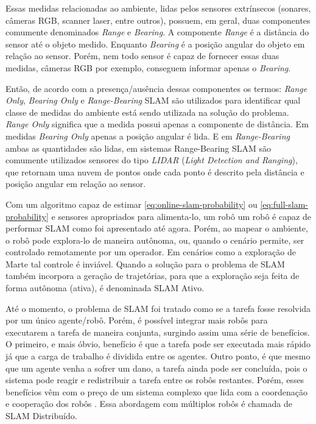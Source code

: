 Essas medidas relacionadas ao ambiente, lidas pelos sensores extrínsecos 
(sonares, câmeras RGB, scanner laser, entre outros), possuem, em geral, duas 
componentes comumente denominados \textit{Range} e \textit{Bearing}. 
A componente \textit{Range} é a distância do sensor até o objeto medido. 
Enquanto \textit{Bearing} é a posição angular do objeto em relação ao sensor. 
Porém, nem todo sensor é capaz de fornecer essas duas medidas, câmeras RGB por 
exemplo, conseguem  informar apenas o \textit{Bearing}.

Então, de acordo com a presença/ausência dessas componentes os termos: 
\textit{Range Only}, \textit{Bearing Only} e \textit{Range-Bearing} SLAM são 
utilizados para identificar qual classe de medidas do ambiente está sendo
utilizada na solução do problema. \textit{Range Only} significa que a medida 
possui apenas a 
componente de distância. Em medidas \textit{Bearing Only} apenas a posição 
angular é lida. E em \textit{Range-Bearing} ambas as quantidades são lidas, em 
sistemas Range-Bearing SLAM são comumente utilizados sensores do tipo 
\emph{LIDAR} (\textit{Light Detection and Ranging}), que retornam uma nuvem de 
pontos onde cada ponto é descrito pela distância e posição angular em relação ao 
sensor.

Com um algoritmo capaz de estimar \ref{eq:online-slam-probability} ou 
\ref{eq:full-slam-probability} e sensores apropriados para alimenta-lo, um robô 
um robô é capaz de performar SLAM como foi apresentado até agora. Porém, ao mapear 
o ambiente, o robô pode explora-lo de maneira autônoma, ou, quando 
o cenário permite, ser controlado remotamente por um operador. Em cenários 
como a exploração de Marte tal controle é inviável. Quando a 
solução para o problema de SLAM também incorpora a geração de trajetórias, para 
que a exploração seja feita de forma autônoma (ativa), é denominada SLAM Ativo.

Até o momento, o problema de SLAM foi tratado como se a tarefa fosse resolvida 
por um único agente/robô. Porém, é possível integrar mais robôs para executarem 
a tarefa de maneira conjunta, surgindo assim uma série de benefícios. O primeiro, 
e mais óbvio, benefício é que a tarefa pode ser executada mais rápido já que a 
carga de trabalho é dividida entre os agentes. Outro ponto, é que mesmo que um 
agente venha a sofrer um dano, a tarefa ainda pode ser concluída, pois o sistema 
pode reagir e redistribuir a tarefa entre os robôs restantes. Porém, esses 
benefícios vêm com o preço de um sistema complexo que lida com a 
coordenação e cooperação dos robôs \cite{saeedi2016multiple}. Essa abordagem com 
múltiplos robôs é chamada de SLAM Distribuído.

